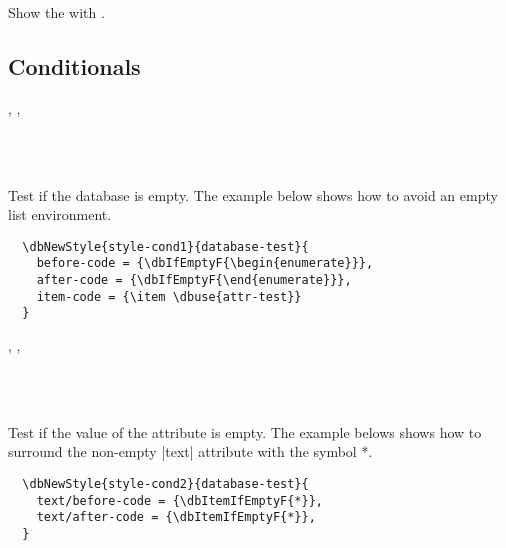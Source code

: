 \documentclass[full]{l3doc}
\begin{document}
\begin{documentation}
\begin{function}{\dbshow}
  \begin{syntax}
      
  \end{syntax}

  Show the  with .
\end{function}

\subsection{Conditionals}

\begin{function}{\dbIfEmptyT, \dbIfEmptyF, \dbIfEmptyTF}
  \begin{syntax}
       \\
      \\
     
  \end{syntax}

  Test if the database is empty. The example below shows how to avoid an empty
  list environment.
\end{function}

\begin{verbatim}
  \dbNewStyle{style-cond1}{database-test}{
    before-code = {\dbIfEmptyF{\begin{enumerate}}},
    after-code = {\dbIfEmptyF{\end{enumerate}}},
    item-code = {\item \dbuse{attr-test}}
  }
\end{verbatim}

\begin{function}{\dbItemIfEmptyT, \dbItemIfEmptyF, \dbItemIfEmptyTF}
  \begin{syntax}
       \\
      \\
     
  \end{syntax}

  Test if the value of the attribute is empty. The example belows shows how to
  surround the non-empty |text| attribute with the symbol *.
\end{function}

\begin{verbatim}
  \dbNewStyle{style-cond2}{database-test}{
    text/before-code = {\dbItemIfEmptyF{*}},
    text/after-code = {\dbItemIfEmptyF{*}},
  }
\end{verbatim}


\end{documentation}
\end{document}
